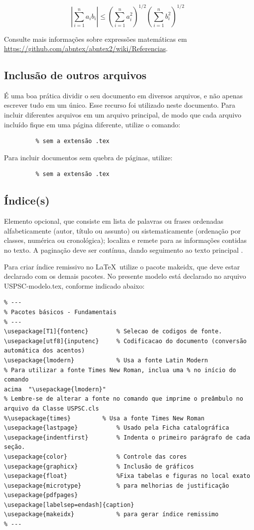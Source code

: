 \[
\left|\sum_{i=1}^n a_ib_i\right|
\le
\left(\sum_{i=1}^n a_i^2\right)^{1/2}
\left(\sum_{i=1}^n b_i^2\right)^{1/2}
\]

Consulte mais informações sobre expressões matemáticas em
\url{https://github.com/abntex/abntex2/wiki/Referencias}.



\subsection{Inclusão de outros arquivos}\label{sec-include}

É uma boa prática dividir o seu documento em diversos arquivos, e não
apenas escrever tudo em um único. Esse recurso foi utilizado neste
documento. Para incluir diferentes arquivos em um arquivo principal,
de modo que cada arquivo incluído fique em uma página diferente, utilize o
comando:

\begin{verbatim}
         % sem a extensão .tex
\end{verbatim}

Para incluir documentos sem quebra de páginas, utilize:

\begin{verbatim}
         % sem a extensão .tex
\end{verbatim}
\subsection{Índice(s)}
Elemento opcional, que consiste em lista de palavras ou frases ordenadas alfabeticamente (autor, título ou assunto) ou sistematicamente (ordenação por classes, numérica ou cronológica); localiza e remete para as informações contidas no texto. A paginação deve ser contínua, dando seguimento ao texto principal \cite{sibi2009}.

Para criar índice remissivo no \LaTeX\  utilize o pacote makeidx, que deve estar declarado com os demais pacotes. No presente modelo está declarado no arquivo USPSC-modelo.tex, conforme indicado abaixo:

\begin{verbatim}
% ---
% Pacotes básicos - Fundamentais 
% ---
\usepackage[T1]{fontenc}		% Selecao de codigos de fonte.
\usepackage[utf8]{inputenc}		% Codificacao do documento (conversão 
automática dos acentos)
\usepackage{lmodern}			% Usa a fonte Latin Modern
% Para utilizar a fonte Times New Roman, inclua uma % no início do comando 
acima  "\usepackage{lmodern}"
% Lembre-se de alterar a fonte no comando que imprime o preâmbulo no 
arquivo da Classe USPSC.cls
%\usepackage{times}			% Usa a fonte Times New Roman					
\usepackage{lastpage}			% Usado pela Ficha catalográfica
\usepackage{indentfirst}		% Indenta o primeiro parágrafo de cada seção.
\usepackage{color}				% Controle das cores
\usepackage{graphicx}			% Inclusão de gráficos
\usepackage{float} 				%Fixa tabelas e figuras no local exato
\usepackage{microtype} 			% para melhorias de justificação
\usepackage{pdfpages}
\usepackage[labelsep=endash]{caption}
\usepackage{makeidx}            % para gerar índice remissimo
% ---
\end{verbatim}

